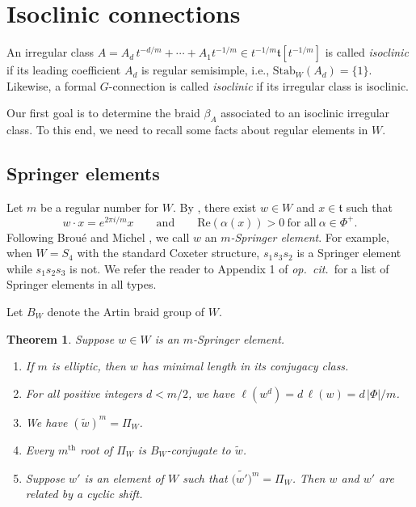 \documentclass[11pt]{amsart}
\newtheorem{thm}{Theorem}
\theoremstyle{definition}
\newcommand{\op}{\emph{op.\ cit.}\ }
\newcommand{\ft}{\mathfrak{t}}
\begin{document}
\section{Isoclinic connections} \label{s:isoclinic}


An irregular class $A=A_d\, t^{-d/m}+\cdots +A_1t^{-1/m} \in t^{-1/m}\ft[t^{-1/m}]$ is called \emph{isoclinic} if its leading coefficient $A_d$ is regular semisimple, i.e., $\mathrm{Stab}_W(A_d)=\{1\}$.   Likewise, a formal $G$-connection is called \emph{isoclinic} if its irregular class is isoclinic.


Our first goal is to determine the braid $\beta_A$ associated to an isoclinic irregular class. To this end, we need to recall some facts about regular elements in $W$. 



\subsection{Springer elements}

Let $m$ be a regular number for $W$. By \cite[Proposition 4.10]{Springer}, there exist $w\in W$ and $x\in \ft$ such that
\[
w\cdot x=e^{2\pi i/m}x \qquad \text{and} \qquad \mathrm{Re}(\alpha(x))>0 \ \text{for all}\ \alpha\in \Phi^+.
\]
Following Brou\'{e} and Michel \cite{BM}, we call $w$ an \emph{$m$-Springer element}. For example, when $W=S_4$ with the standard Coxeter structure, $s_1s_3s_2$ is a Springer element while $s_1s_2s_3$ is not. We refer the reader to Appendix 1 of \op for a list of Springer elements in all types. 

Let $B_W$ denote the Artin braid group of $W$. 

\begin{thm} \label{t:Springer}
Suppose $w\in W$ is an $m$-Springer element.
\begin{enumerate} 
\item If $m$ is elliptic, then $w$ has minimal length in its conjugacy class. 
\item For all positive integers $d<m/2$, we have $\ell(w^d)=d\,\ell(w)=d\, |\Phi|/m$. 
\item We have $(\widetilde{w})^m=\Pi_W$.
\item Every $m^{\text{th}}$ root of $\Pi_W$ is $B_W$-conjugate to $\widetilde{w}$. 
\item Suppose $w'$ is an element of $W$ such that $\big(\widetilde{w'}\big)^m=\Pi_W$. Then $w$ and $w'$ are related by a cyclic shift. 
\end{enumerate}
\end{thm} 
\end{document}
